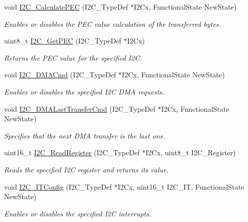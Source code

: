 \begin{DoxyCompactItemize}
void \mbox{\hyperlink{group___i2_c_gae86801251359226c35745e0a258388b0}{I2\+C\+\_\+\+Calculate\+P\+EC}} (I2\+C\+\_\+\+Type\+Def $\ast$I2\+Cx, Functional\+State New\+State)
\begin{DoxyCompactList}\small\item\em Enables or disables the P\+EC value calculation of the transferred bytes. \end{DoxyCompactList}\item 
uint8\+\_\+t \mbox{\hyperlink{group___i2_c_ga7bf75e7c27c0e1d73e70fc0e1c7cd1dd}{I2\+C\+\_\+\+Get\+P\+EC}} (I2\+C\+\_\+\+Type\+Def $\ast$I2\+Cx)
\begin{DoxyCompactList}\small\item\em Returns the P\+EC value for the specified I2C. \end{DoxyCompactList}\item 
void \mbox{\hyperlink{group___i2_c_ga38502ce11e5ec923e0f6476aaa35b45c}{I2\+C\+\_\+\+D\+M\+A\+Cmd}} (I2\+C\+\_\+\+Type\+Def $\ast$I2\+Cx, Functional\+State New\+State)
\begin{DoxyCompactList}\small\item\em Enables or disables the specified I2C D\+MA requests. \end{DoxyCompactList}\item 
void \mbox{\hyperlink{group___i2_c_gab2e994c5681eb6ec7c26a03ffe1de060}{I2\+C\+\_\+\+D\+M\+A\+Last\+Transfer\+Cmd}} (I2\+C\+\_\+\+Type\+Def $\ast$I2\+Cx, Functional\+State New\+State)
\begin{DoxyCompactList}\small\item\em Specifies that the next D\+MA transfer is the last one. \end{DoxyCompactList}\item 
uint16\+\_\+t \mbox{\hyperlink{group___i2_c_ga8021dc796d15f997356b0583d6346805}{I2\+C\+\_\+\+Read\+Register}} (I2\+C\+\_\+\+Type\+Def $\ast$I2\+Cx, uint8\+\_\+t I2\+C\+\_\+\+Register)
\begin{DoxyCompactList}\small\item\em Reads the specified I2C register and returns its value. \end{DoxyCompactList}\item 
void \mbox{\hyperlink{group___i2_c_ga58fed146a06cb81d2940604e460de047}{I2\+C\+\_\+\+I\+T\+Config}} (I2\+C\+\_\+\+Type\+Def $\ast$I2\+Cx, uint16\+\_\+t I2\+C\+\_\+\+IT, Functional\+State New\+State)
\begin{DoxyCompactList}\small\item\em Enables or disables the specified I2C interrupts. \end{DoxyCompactList}\item 

\end{DoxyCompactItemize}
